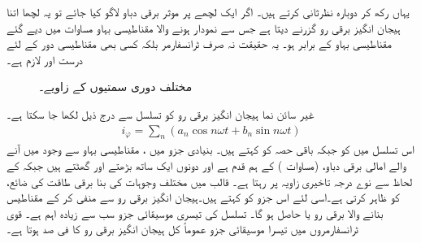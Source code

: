 یہاں رکھ کر دوبارہ نظرثانی کرتے ہیں۔ اگر ایک  لچھے پر  موثر برقی دباو لاگو کیا جائے تو یہ لچھا اتنا ہیجان انگیز برقی رو  گزرنے دیتا ہے جس سے نمودار ہونے والا مقناطیسی بہاو مساوات   میں دیے گئے مقناطیسی بہاو  کے برابر ہو۔ یہ حقیقت  نہ صرف ٹرانسفارمر بلکہ کسی بھی مقناطیسی دور کے لئے درست اور لازم ہے۔
\begin{figure}
\centering
\caption{مختلف دوری سمتیوں کے زاویے۔}
\label{شکل_ٹرانسفارمر_مرکزی_ضیاع_اور_مقناطیسی_رو}
\end{figure}

غیر سائن نما ہیجان انگیز برقی رو  کو  تسلسل سے درج ذیل لکھا جا سکتا ہے۔
\begin{align} 
i_{\varphi}=\sum_n {\left( a_n \cos n \omega t + b_n \sin n\omega t \right)}
\end{align}
اس تسلسل میں  کو   جبکہ باقی حصہ کو    کہتے ہیں۔ بنیادی جزو میں ، مقناطیسی بہاو سے وجود میں آنے والے امالی برقی دباو،   (مساوات )  کے ہم قدم ہے اور  دونوں ایک ساتھ بڑھتے اور گھٹتے ہیں جبکہ   کے لحاظ سے  نوے درجہ تاخیری  زاویہ  پر رہتا ہے۔ قالب میں مختلف وجوہات کی بنا برقی طاقت کی ضائع،  کو  ظاہر  کرتی ہے۔اسی لئے اس جزو کو   کہتے ہیں۔ہیجان انگیز برقی رو  سے  منفی کر کے مقناطیس بنانے والا برقی رو یا
 حاصل ہو گا۔ تسلسل  کی تیسری موسیقائی جزو سب سے زیادہ اہم  ہے۔ قوی  ٹرانسفارمروں میں  تیسرا موسیقائی جزو عموماً  کل ہیجان انگیز برقی رو  کا  فی صد ہوتا ہے۔  

